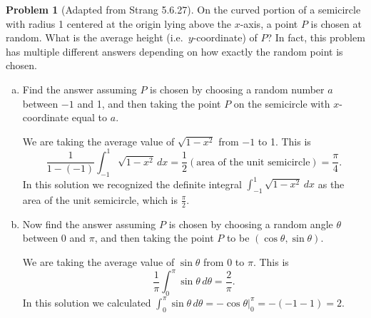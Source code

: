 \documentclass[11pt,oneside]{amsart}
\theoremstyle{definition}
\newtheorem{problem}{Problem}
\begin{document}
    \begin{problem}[Adapted from Strang 5.6.27]
        On the curved portion of a semicircle with radius 1 centered at the origin lying above the $x$-axis, a point $P$ is chosen at random. What is the average height (i.e.\ $y$-coordinate) of $P$? In fact, this problem has multiple different answers depending on how exactly the random point is chosen.
        \begin{enumerate}[(a)]
            \item Find the answer assuming $P$ is chosen by choosing a random number $a$ between $-1$ and 1, and then taking the point $P$ on the semicircle with $x$-coordinate equal to $a$.
            \begin{solution}
                We are taking the average value of $\sqrt{1-x^2}$ from $-1$ to 1. This is
                \[\frac 1{1-(-1)}\int_{-1}^1\sqrt{1-x^2}\,dx = \frac 12(\text{area of the unit semicircle})=\frac{\pi}4.\]
                In this solution we recognized the definite integral $\int_{-1}^1\sqrt{1-x^2}\,dx$ as the area of the unit semicircle, which is $\frac{\pi}2$.
            \end{solution}
            \item Now find the answer assuming $P$ is chosen by choosing a random angle $\theta$ between 0 and $\pi$, and then taking the point $P$ to be $(\cos\theta,\sin\theta)$.
            \begin{solution}
                We are taking the average value of $\sin\theta$ from 0 to $\pi$. This is
                \[\frac 1\pi \int_0^\pi\sin\theta\,d\theta=\frac 2{\pi}.\]
                In this solution we calculated $\int_0^\pi\sin\theta\,d\theta=-\cos\theta\Big|_0^\pi=-(-1-1)=2$.
            \end{solution}
        \end{enumerate}
    \end{problem}
\end{document}
